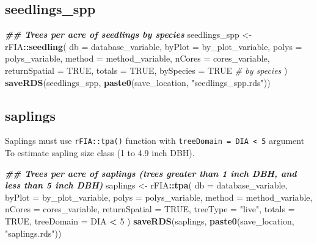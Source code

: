 \documentclass[
]{book}
\newenvironment{Shaded}{\begin{snugshade}}{\end{snugshade}}
\newcommand{\AttributeTok}[1]{\textcolor[rgb]{0.13,0.29,0.53}{#1}}
\newcommand{\CommentTok}[1]{\textcolor[rgb]{0.56,0.35,0.01}{\textit{#1}}}
\newcommand{\ConstantTok}[1]{\textcolor[rgb]{0.56,0.35,0.01}{#1}}
\newcommand{\DecValTok}[1]{\textcolor[rgb]{0.00,0.00,0.81}{#1}}
\newcommand{\DocumentationTok}[1]{\textcolor[rgb]{0.56,0.35,0.01}{\textbf{\textit{#1}}}}
\newcommand{\FunctionTok}[1]{\textcolor[rgb]{0.13,0.29,0.53}{\textbf{#1}}}
\newcommand{\NormalTok}[1]{#1}
\newcommand{\OtherTok}[1]{\textcolor[rgb]{0.56,0.35,0.01}{#1}}
\newcommand{\SpecialCharTok}[1]{\textcolor[rgb]{0.81,0.36,0.00}{\textbf{#1}}}
\newcommand{\StringTok}[1]{\textcolor[rgb]{0.31,0.60,0.02}{#1}}
\begin{document}
\hypertarget{seedlings_spp}{%
\subsection{seedlings\_spp}\label{seedlings_spp}}

\begin{Shaded}
\begin{Highlighting}[]
\DocumentationTok{\#\# Trees per acre of seedlings by species}
\NormalTok{seedlings\_spp }\OtherTok{\textless{}{-}}\NormalTok{ rFIA}\SpecialCharTok{::}\FunctionTok{seedling}\NormalTok{(}
  \AttributeTok{db =}\NormalTok{ database\_variable,}
  \AttributeTok{byPlot =}\NormalTok{ by\_plot\_variable,}
  \AttributeTok{polys =}\NormalTok{ polys\_variable,}
  \AttributeTok{method =}\NormalTok{ method\_variable,}
  \AttributeTok{nCores =}\NormalTok{ cores\_variable,}
  \AttributeTok{returnSpatial =} \ConstantTok{TRUE}\NormalTok{,}
  \AttributeTok{totals =} \ConstantTok{TRUE}\NormalTok{,}
  \AttributeTok{bySpecies =} \ConstantTok{TRUE} \CommentTok{\# by species}
\NormalTok{) }
\FunctionTok{saveRDS}\NormalTok{(seedlings\_spp, }\FunctionTok{paste0}\NormalTok{(save\_location, }\StringTok{"seedlings\_spp.rds"}\NormalTok{))}
\end{Highlighting}
\end{Shaded}

\hypertarget{saplings}{%
\subsection{saplings}\label{saplings}}

Saplings must use \texttt{rFIA::tpa()} function with \texttt{treeDomain\ =\ DIA\ \textless{}\ 5} argument To estimate sapling size class (1 to 4.9 inch DBH).

\begin{Shaded}
\begin{Highlighting}[]
\DocumentationTok{\#\# Trees per acre of saplings (trees greater than 1 inch DBH, and less than 5 inch DBH)}
\NormalTok{saplings }\OtherTok{\textless{}{-}}\NormalTok{ rFIA}\SpecialCharTok{::}\FunctionTok{tpa}\NormalTok{(}
  \AttributeTok{db =}\NormalTok{ database\_variable,}
  \AttributeTok{byPlot =}\NormalTok{ by\_plot\_variable,}
  \AttributeTok{polys =}\NormalTok{ polys\_variable,}
  \AttributeTok{method =}\NormalTok{ method\_variable,}
  \AttributeTok{nCores =}\NormalTok{ cores\_variable,}
  \AttributeTok{returnSpatial =} \ConstantTok{TRUE}\NormalTok{,}
  \AttributeTok{treeType =} \StringTok{"live"}\NormalTok{,}
  \AttributeTok{totals =} \ConstantTok{TRUE}\NormalTok{,}
  \AttributeTok{treeDomain =}\NormalTok{ DIA }\SpecialCharTok{\textless{}} \DecValTok{5}
\NormalTok{) }
\FunctionTok{saveRDS}\NormalTok{(saplings, }\FunctionTok{paste0}\NormalTok{(save\_location, }\StringTok{"saplings.rds"}\NormalTok{))}
\end{Highlighting}
\end{Shaded}
\end{document}
